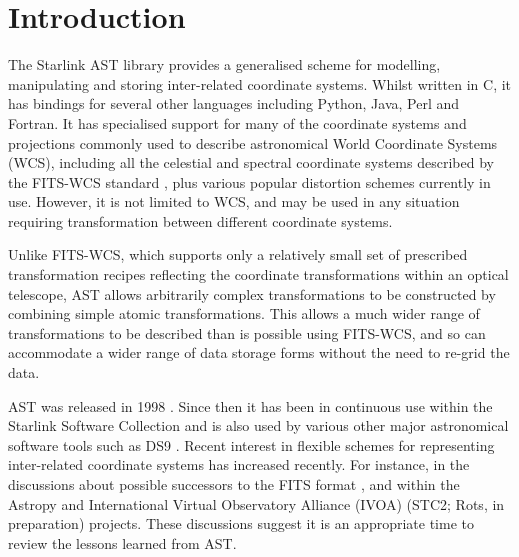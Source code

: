 \documentclass[final,authoryear,5p,times,twocolumn]{elsarticle}
\begin{document}

\newcommand{\mnras}{Mon Not R Astron Soc}
\newcommand{\aap}{Astron Astrophys}
\newcommand{\aaps}{Astron Astrophys Supp}
\newcommand{\pasp}{Pub Astron Soc Pacific}
\newcommand{\apj}{Astrophys J}
\newcommand{\apjs}{Astrophys J Supp}
\newcommand{\qjras}{Quart J R Astron Soc}
\newcommand{\an}{Astron.\ Nach.}
\newcommand{\ijimw}{Int.\ J.\ Infrared \& Millimeter Waves}
\newcommand{\procspie}{Proc.\ SPIE}
\newcommand{\aspconf}{ASP Conf. Ser.}

\newcommand{\ascl}[1]{\href{http://www.ascl.net/#1}{ascl:#1}}

\section{Introduction}
\label{sec:intro}

The Starlink AST library \citep[][\ascl{1404.016}]{SUN211} provides a
generalised scheme for modelling, manipulating and storing inter-related
coordinate systems. Whilst written in C, it has bindings for several
other languages including Python, Java, Perl and Fortran. It has
specialised support for many of the coordinate systems and projections
commonly used to describe astronomical World Coordinate Systems (WCS),
including all the celestial and spectral coordinate systems described by
the FITS-WCS standard \citep{FITSWCSI,FITSWCSII,FITSWCSIII}, plus various
popular distortion schemes currently in use. However, it is not limited to
WCS, and may be used in any situation requiring transformation between
different coordinate systems.

Unlike FITS-WCS, which supports only a relatively small set of prescribed
transformation recipes reflecting the coordinate transformations within
an optical telescope, AST allows arbitrarily complex transformations to be
constructed by combining simple atomic transformations. This allows a much
wider range of transformations to be
described than is possible using FITS-WCS, and so can accommodate a wider
range of data storage forms without the need to re-grid the data.

AST was released in 1998 \cite[][included in ``Twenty Years of
ADASS'' \nocite{adass20}]{1998ASPC..145...41W}. Since then it has been in
continuous use within the Starlink Software Collection \citep[][\ascl{1110.012}]{2014ASPC..485..391C}
and is also used by various other major astronomical software tools such as
DS9 \citep[][\ascl{0003.002}]{2003ASPC..295..489J}.
Recent interest in flexible schemes for representing inter-related
coordinate systems has increased recently.  For instance, in the
discussions about possible successors to the FITS format
\citep{2015Mink,2015A&C....12..240G,2016Shortridge}, and within the
Astropy \citep{2013A&A...558A..33A,P028_adassxxv} and International
Virtual Observatory Alliance (IVOA) (STC2; Rots, in preparation)
projects. These discussions suggest it is an appropriate time to
review the lessons learned from AST.
\end{document}

